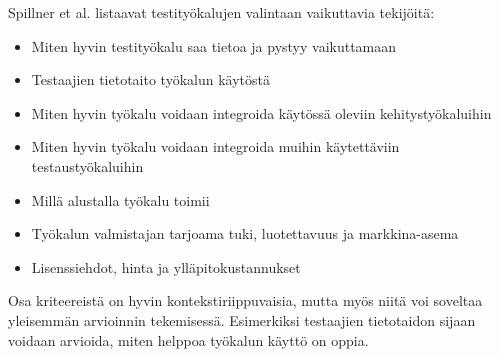 Spillner et al. \cite[218]{testing_foundations} listaavat testityökalujen valintaan vaikuttavia tekijöitä:
\begin{itemize}
  \itemsep0em
  \item Miten hyvin testityökalu saa tietoa ja pystyy vaikuttamaan 
  \item Testaajien tietotaito työkalun käytöstä
  \item Miten hyvin työkalu voidaan integroida käytössä oleviin kehitystyökaluihin
  \item Miten hyvin työkalu voidaan integroida muihin käytettäviin testaustyökaluihin
  \item Millä alustalla työkalu toimii
  \item Työkalun valmistajan tarjoama tuki, luotettavuus ja markkina-asema
  \item Lisenssiehdot, hinta ja ylläpitokustannukset
\end{itemize}

Osa kriteereistä on hyvin kontekstiriippuvaisia, mutta myös niitä voi soveltaa yleisemmän arvioinnin tekemisessä. Esimerkiksi testaajien tietotaidon sijaan voidaan arvioida, miten helppoa työkalun käyttö on oppia.